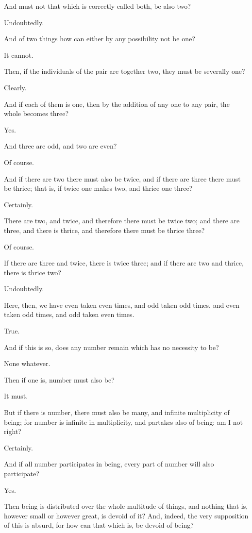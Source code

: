 And must not that which is correctly called both, be also two?

Undoubtedly.

And of two things how can either by any possibility not be one?

It cannot.

Then, if the individuals of the pair are together two, they must be
severally one?

Clearly.

And if each of them is one, then by the addition of any one to any pair,
the whole becomes three?

Yes.

And three are odd, and two are even?

Of course.

And if there are two there must also be twice, and if there are three
there must be thrice; that is, if twice one makes two, and thrice one
three?

Certainly.

There are two, and twice, and therefore there must be twice two; and
there are three, and there is thrice, and therefore there must be thrice
three?

Of course.

If there are three and twice, there is twice three; and if there are two
and thrice, there is thrice two?

Undoubtedly.

Here, then, we have even taken even times, and odd taken odd times, and
even taken odd times, and odd taken even times.

True.

And if this is so, does any number remain which has no necessity to be?

None whatever.

Then if one is, number must also be?

It must.

But if there is number, there must also be many, and infinite
multiplicity of being; for number is infinite in multiplicity, and
partakes also of being: am I not right?

Certainly.

And if all number participates in being, every part of number will also
participate?

Yes.

Then being is distributed over the whole multitude of things, and
nothing that is, however small or however great, is devoid of it? And,
indeed, the very supposition of this is absurd, for how can that which
is, be devoid of being?

